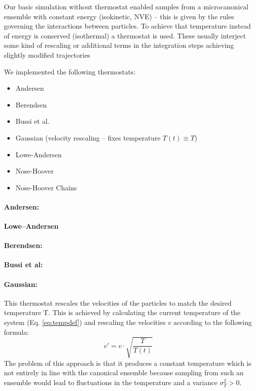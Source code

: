 

Our basic simulation without thermostat enabled samples from a microcanonical ensemble with constant energy (isokinetic, NVE) -- this is given by the rules governing the interactions between particles.
To achieve that temperature instead of energy is conserved (isothermal) a thermostat is used. These usually interject some kind of rescaling or additional terms in the integration steps achieving slightly modified trajectories

We implemented the following thermostats: %
\begin{itemize}
\item Andersen
\item Berendsen
\item Bussi et al.
\item Gaussian (velocity rescaling -- fixes temperature $T(t) \equiv T$)
\item Lowe-Andersen
\item Nose-Hoover
\item Nose-Hoover Chains
\end{itemize}

\paragraph{Andersen:}
\paragraph{Lowe--Andersen}
\paragraph{Berendsen:}
\paragraph{Bussi et al:}
\paragraph{Gaussian:} This thermostat rescales the velocities of the particles to match the desired temperature T. This is achieved by calculating the current temperature of the system (Eq. \eqref{eq:tempdef}) and rescaling the velocities $v$ according to the following formula:
\begin{equation*}
v'  = v\cdot \sqrt{\frac{T}{T(t)}}
\end{equation*}
The problem of this approach is that it produces a constant temperature which is not entirely in line with the canonical ensemble because sampling from such an ensemble would lead to fluctuations in the temperature and a variance $\sigma_T^2 > 0$.

